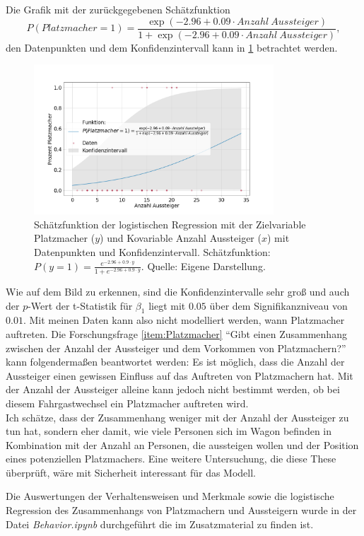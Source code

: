 Die Grafik mit der zurückgegebenen Schätzfunktion $$P(Platzmacher=1) = \frac{\exp(-2.96+0.09 \cdot Anzahl \ Aussteiger)}{1+\exp(-2.96+0.09 \cdot Anzahl \ Aussteiger)},$$
den Datenpunkten und dem Konfidenzintervall kann in \figurename \ref{fig:LogRegPM} betrachtet werden.
\begin{figure}[H]
	\centering
		\includegraphics[width=0.8\textwidth]{pictures/data_evaluation/behavior/log_reg_spacemaker.png}
	\caption{Schätzfunktion der logistischen Regression mit der Zielvariable Platzmacher ($y$) und Kovariable Anzahl Aussteiger ($x$) mit Datenpunkten und Konfidenzintervall. Schätzfunktion: $P(y=1) = \frac{e^{-2.96+0.9 \cdot y}}{1 + e^{-2.96 + 0.9 \cdot y}}$. Quelle: Eigene Darstellung.}
	\label{fig:LogRegPM}
\end{figure}
Wie auf dem Bild zu erkennen, sind die Konfidenzintervalle sehr groß und auch der $p$-Wert der t-Statistik für $\beta_1$ liegt mit $0.05$ über dem Signifikanzniveau von $0.01$. Mit meinen Daten kann also nicht modelliert werden, wann Platzmacher auftreten. Die Forschungsfrage \ref{item:Platzmacher} "`Gibt einen Zusammenhang zwischen der Anzahl der Aussteiger und dem Vorkommen von Platzmachern?"' kann folgendermaßen beantwortet werden:
Es ist möglich, dass die Anzahl der Aussteiger einen gewissen Einfluss auf das Auftreten von Platzmachern hat. Mit der Anzahl der Aussteiger alleine kann jedoch nicht bestimmt werden, ob bei diesem Fahrgastwechsel ein Platzmacher auftreten wird.\\
Ich schätze, dass der Zusammenhang weniger mit der Anzahl der Aussteiger zu tun hat, sondern eher damit, wie viele Personen sich im Wagon befinden in Kombination mit der Anzahl an Personen, die aussteigen wollen und der Position eines potenziellen Platzmachers. Eine weitere Untersuchung, die diese These überprüft, wäre mit Sicherheit interessant für das Modell.

Die Auswertungen der Verhaltensweisen und Merkmale sowie die logistische Regression des Zusammenhangs von Platzmachern und Aussteigern wurde in der Datei \textsl{Behavior.ipynb} durchgeführt die im Zusatzmaterial zu finden ist.

